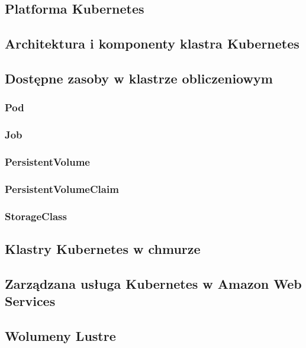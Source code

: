 \subsection{Platforma Kubernetes}

\subsection{Architektura i komponenty klastra Kubernetes}

\subsection{Dostępne zasoby w klastrze obliczeniowym}

\subsubsection{Pod}

\subsubsection{Job}

\subsubsection{PersistentVolume}

\subsubsection{PersistentVolumeClaim}

\subsubsection{StorageClass}

\subsection{Klastry Kubernetes w chmurze}

\subsection{Zarządzana usługa Kubernetes w Amazon Web Services}

\subsection{Wolumeny Lustre}

